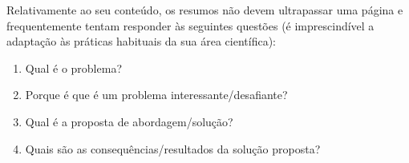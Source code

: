 Relativamente ao seu conteúdo, os resumos não devem ultrapassar uma página e frequentemente tentam responder às seguintes questões (é imprescindível a adaptação às práticas habituais da sua área científica):

\begin{enumerate}
  \item Qual é o problema?
  \item Porque é que é um problema interessante/desafiante?
  \item Qual é a proposta de abordagem/solução?
  \item Quais são as consequências/resultados da solução proposta?
\end{enumerate}

%
%

